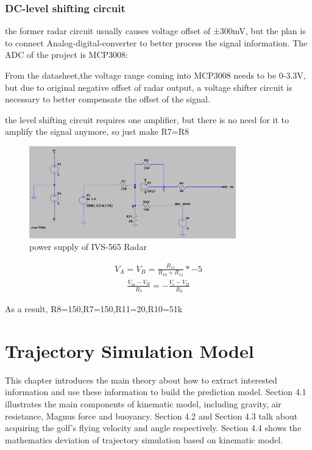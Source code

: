 \subsubsection{DC-level shifting circuit}
the former radar circuit usually causes voltage offset of ±300mV, but the plan is to connect Analog-digital-converter to better process the signal information. The ADC of the project is MCP3008:

From the datasheet\textcite{mcp3008},the voltage range coming into MCP3008 needs to be 0-3.3V, but due to original negative offset of radar output, a voltage shifter circuit is necessary to better compensate the offset of the signal.

the level shifting circuit requires one amplifier, but there is no need for it to amplify the signal anymore, so just make  R7=R8
\begin{figure}[H]
    \centering
    \includegraphics[width=0.8\textwidth]{figure/level shifting circuit.png}
    \caption{power supply of IVS-565 Radar}
    \label{fig:power_radar}
\end{figure}

\begin{align}
V_{A}=V_{B}=\frac{R_{11}}{R_{10}+R_{11}} *-5
\end{align}
\begin{align}
\frac{V_{i n}-V_{B}}{R_{7}}=-\frac{V_{c}-V_{B}}{R_{8}}
\end{align}

As a result, R8=150,R7=150,R11=20,R10=51k


\newpage
\section{Trajectory Simulation Model}
This chapter introduces the main theory about how to extract interested information and use these information to build the prediction model. Section 4.1 illustrates the main components of kinematic model, including gravity, air resistance, Magnus force and buoyancy. Section 4.2 and Section 4.3 talk about acquiring the golf's flying velocity and angle respectively. Section 4.4 shows the mathematics deviation of trajectory simulation based on kinematic model.
